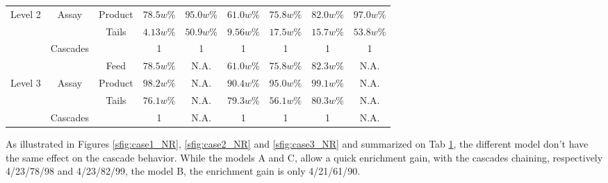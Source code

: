 \begin{table}[h!]
\begin{tabular}{ccccccccc}
Level 2 & Assay      & Product   & $78.5w\%$ & $95.0w\%$ & $61.0w\%$ & $75.8w\%$ & $82.0w\%$ & $97.0w\%$ \\
        &            & Tails     & $4.13w\%$ & $50.9w\%$ & $9.56w\%$ & $17.5w\%$ & $15.7w\%$ & $53.8w\%$ \\
        & Cascades   &           & 1         & 1         & 1         & 1         & 1         & 1         \\
\midrule                                                                                                 
        &            & Feed      & $78.5w\%$ & N.A.      & $61.0w\%$ & $75.8w\%$ & $82.3w\%$ & N.A.      \\
Level 3 & Assay      & Product   & $98.2w\%$ & N.A.      & $90.4w\%$ & $95.0w\%$ & $99.1w\%$ & N.A.      \\
        &            & Tails     & $76.1w\%$ & N.A.      & $79.3w\%$ & $56.1w\%$ & $80.3w\%$ & N.A.      \\
        & Cascades   &           & 1         & N.A.      & 1         & 1         & 1         & N.A.      \\
\bottomrule
\end{tabular}
  \label{tab:level}
\end{table}

As illustrated in Figures \ref{sfig:case1_NR}, \ref{sfig:case2_NR} and
\ref{sfig:case3_NR} and summarized on Tab \ref{tab:level}, the different model
don't have the same effect on the cascade behavior. While the models A and C,
allow a quick enrichment gain, with the cascades chaining, respectively
4/23/78/98 and 4/23/82/99, the model B, the enrichment gain is only
4/21/61/90. 


